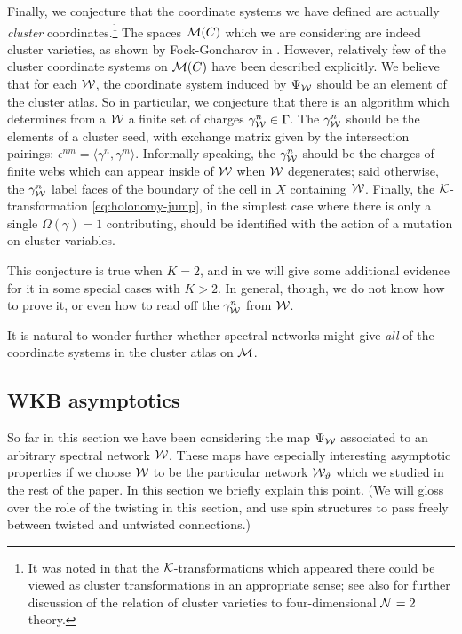 \documentclass[11pt,a4paper]{article}
\def\CM {{\cal M}}
\def\CN{{\cal N}}
\def\CK {{\cal K}}
\def\CN {{\cal N}}
\def\wnet {{\cal W}}
\def\CK{{\cal K}}
\def\cK{{\cal K}}
\newcommand{\ti}[1]{\textit{#1}}
\def\CM {{\cal M}}
\def\CN{{\cal N}}
\def\CK {{\cal K}}
\def\CN {{\cal N}}
\def\wnet {{\cal W}}
\def\CK{{\cal K}}
\newcommand{\inprod}[1]{\langle#1\rangle}
\newcommand\eps{\epsilon}
\begin{document}
Finally, we conjecture that the coordinate systems we have defined are actually
\ti{cluster} coordinates.\footnote{It was noted in \cite{ks1,Gaiotto:2010be} that
the $\CK$-transformations which appeared there
could be viewed as cluster transformations in an appropriate sense; see also
\cite{Cecotti:2010fi,Cecotti:1993rm,Alim:2011ae,Alexandrov:2011ac,Cecotti:2011gu} for further
discussion of the relation of cluster varieties to four-dimensional
$\CN=2$ theory.}  The spaces $\CM(C)$ which we are considering are indeed cluster varieties,
as shown by Fock-Goncharov in \cite{MR2233852}.  However, relatively few of the cluster
coordinate systems on $\CM(C)$ have been described explicitly.  We believe that for each $\wnet$, the coordinate system
induced by $\Psi_\wnet$ should be an element of the cluster atlas.
So in particular,
we conjecture that there is an algorithm which determines from a
$\wnet$ a finite set of charges $\gamma^{n}_{\wnet} \in \Gamma$.
The $\gamma^{n}_{\wnet}$ should be the elements of a cluster
seed, with exchange matrix given by the intersection pairings:
$\eps^{nm} = \inprod{\gamma^{n}, \gamma^{m}}$.
Informally speaking, the $\gamma^{n}_\wnet$ should be
the charges of finite webs which can appear inside of $\wnet$ when $\wnet$ degenerates;
said otherwise, the $\gamma^{n}_\wnet$
label faces of the boundary of the cell in $X$ containing $\wnet$.
Finally, the $\cK$-transformation \eqref{eq:holonomy-jump}, in the simplest case where there is only a
single $\Omega(\gamma) = 1$ contributing,
should be identified with the action of a mutation on cluster variables.

This conjecture is true when $K=2$, and in \cite{gmn6-to-appear} we will
give some additional evidence for it in some special cases with $K>2$.  In general, though,
we do not know how to prove it, or even how to read off the $\gamma^{n}_\wnet$ from $\wnet$.

It is natural to wonder further whether spectral networks might give \ti{all} of the coordinate
systems in the cluster atlas on $\CM$.


\subsection{WKB asymptotics}\label{subsec:WKB-Asymptotics}

So far in this section we have been considering the map $\Psi_\wnet$ associated to an arbitrary
spectral network $\wnet$.  These maps have especially interesting asymptotic properties if we choose $\wnet$
to be the particular network $\wnet_\vartheta$ which we studied in the rest of the paper.
In this section we briefly explain this point.  (We will gloss over the role of the twisting in this section,
and use spin structures to pass freely between twisted and untwisted connections.)
\end{document}
